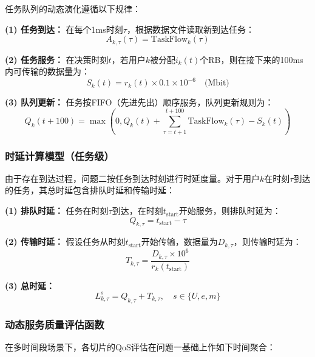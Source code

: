 任务队列的动态演化遵循以下规律：

\textbf{(1) 任务到达：}
在每个1ms时刻$\tau$，根据数据文件读取新到达任务：
\begin{equation}
A_{k,\tau}(\tau) = \text{TaskFlow}_k(\tau)
\end{equation}

\textbf{(2) 任务服务：}
在决策时刻$t$，若用户$k$被分配$i_k(t)$个RB，则在接下来的100ms内可传输的数据量为：
\begin{equation}
S_k(t) = r_k(t) \times 0.1 \times 10^{-6} \quad \text{(Mbit)}
\end{equation}

\textbf{(3) 队列更新：}
任务按FIFO（先进先出）顺序服务，队列更新规则为：
\begin{equation}
\label{eq:queue_evolution}
Q_k(t+100) = \max\left(0, Q_k(t) + \sum_{\tau=t+1}^{t+100} \text{TaskFlow}_k(\tau) - S_k(t)\right)
\end{equation}

\subsubsection{时延计算模型（任务级）}
 
由于存在到达过程，问题二按任务到达时刻进行时延度量。对于用户$k$在时刻$\tau$到达的任务，其总时延包含排队时延和传输时延：

\textbf{(1) 排队时延：}
任务在时刻$\tau$到达，在时刻$t_{\text{start}}$开始服务，则排队时延为：
\begin{equation}
Q_{k,\tau} = t_{\text{start}} - \tau
\end{equation}

\textbf{(2) 传输时延：}
假设任务从时刻$t_{\text{start}}$开始传输，数据量为$D_{k,\tau}$，则传输时延为：
\begin{equation}
T_{k,\tau} = \frac{D_{k,\tau} \times 10^6}{r_k(t_{\text{start}})}
\end{equation}

\textbf{(3) 总时延：}
\begin{equation}
L_{k,\tau}^s = Q_{k,\tau} + T_{k,\tau}, \quad s \in \{U, e, m\}
\end{equation}

\subsubsection{动态服务质量评估函数}
 
在多时间段场景下，各切片的QoS评估在问题一基础上作如下时间聚合：

